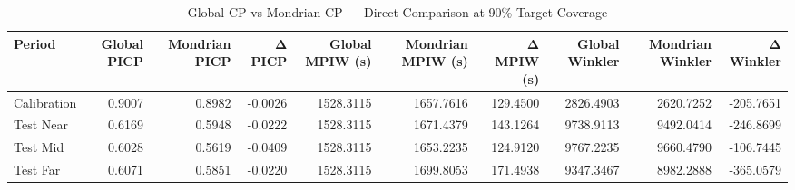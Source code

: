 \begin{table}
\caption{Global CP vs Mondrian CP — Direct Comparison at 90\% Target Coverage}
\label{tab:t4b_2_global_vs_mondrian}
\begin{tabular}{lrrrrrrrrr}
\toprule
Period & Global PICP & Mondrian PICP & Δ PICP & Global MPIW (s) & Mondrian MPIW (s) & Δ MPIW (s) & Global Winkler & Mondrian Winkler & Δ Winkler \\
\midrule
Calibration & 0.9007 & 0.8982 & -0.0026 & 1528.3115 & 1657.7616 & 129.4500 & 2826.4903 & 2620.7252 & -205.7651 \\
Test Near & 0.6169 & 0.5948 & -0.0222 & 1528.3115 & 1671.4379 & 143.1264 & 9738.9113 & 9492.0414 & -246.8699 \\
Test Mid & 0.6028 & 0.5619 & -0.0409 & 1528.3115 & 1653.2235 & 124.9120 & 9767.2235 & 9660.4790 & -106.7445 \\
Test Far & 0.6071 & 0.5851 & -0.0220 & 1528.3115 & 1699.8053 & 171.4938 & 9347.3467 & 8982.2888 & -365.0579 \\
\bottomrule
\end{tabular}
\end{table}
